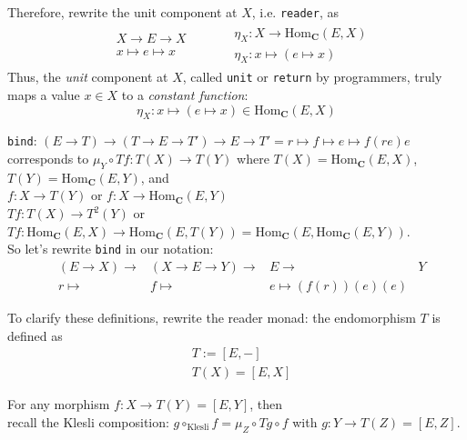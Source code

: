 \documentclass[10pt]{amsart}
\begin{document}
\begin{multicols*}{2}
Therefore, rewrite the unit component at $X$, i.e. \texttt{reader}, as \\
\begin{equation}
\begin{gathered}
\begin{aligned}
& X \to E \to X \\
& x \mapsto e \mapsto x
\end{aligned} \qquad \, 
\begin{aligned}
	& \eta_X : X \to \text{Hom}_{\mathbf{C}}(E,X) \\ 
	& \eta_X : x \mapsto (e\mapsto x)
\end{aligned}
\end{gathered}
\end{equation}
Thus, the \emph{unit} component at $X$, called \texttt{unit} or \texttt{return} by programmers, truly maps a value $x \in X$ to a \emph{constant function}:
\begin{equation}
\eta_X : x \mapsto (e \mapsto x) \in \text{Hom}_{\mathbf{C}}(E, X)
\end{equation}


\texttt{bind}: $(E\to T) \to (T\to E \to T') \to E \to T' = r\mapsto f \mapsto e \mapsto f(re)e$ corresponds to $\mu_Y \circ Tf:T(X) \to T(Y)$ where $T(X) = \text{Hom}_{\mathbf{C}}(E,X)$, $T(Y) = \text{Hom}_{\mathbf{C}}(E,Y)$, and \\
$f:X\to T(Y)$ or $f:X\to \text{Hom}_{\mathbf{C}}(E,Y)$ \\
$Tf : T(X) \to T^2(Y)$ or $Tf : \text{Hom}_{\mathbf{C}}(E,X) \to \text{Hom}_{\mathbf{C}}(E,T(Y)) = \text{Hom}_{\mathbf{C}}(E, \text{Hom}_{\mathbf{C}}(E,Y))$. \\

So let's rewrite \texttt{bind} in our notation:
\[
\begin{aligned}
	& (E\to X) \to & (X \to E \to Y) \to & E \to & Y \\
	& r \mapsto & f \mapsto & e \mapsto (f(r))(e)(e)
\end{aligned}
\]

To clarify these definitions, rewrite the reader monad: the endomorphism $T$ is defined as
\begin{equation}
\boxed{  \begin{aligned} & T := [E, -] \\ & T(X) = [E, X] \end{aligned} }
\end{equation}

For any morphism $f : X \to T(Y) = [E, Y]$, then \\
recall the Klesli composition: $g \circ_{\text{Klesli}} f = \mu_Z \circ Tg \circ f$ with $g: Y \to T(Z) = [E,Z]$. 


\end{multicols*}
\end{document}
